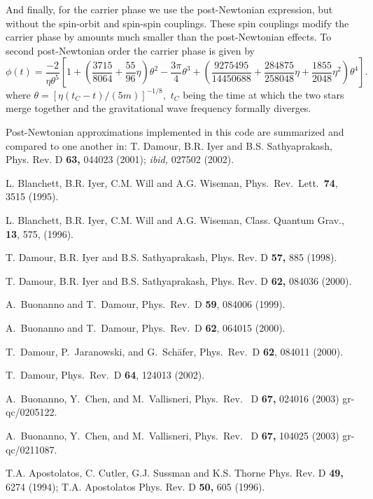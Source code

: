 And finally, for the carrier phase we use the post-Newtonian 
expression, but without the spin-orbit and
spin-spin couplings. These spin couplings modify the carrier phase 
by amounts much smaller than the post-Newtonian effects.
To second post-Newtonian order the carrier phase is given by
\begin{equation}
\phi(t) = 
\frac{-2}{\eta\theta^5}\left[1+\left(\frac{3715}{8064}+\frac
{55}{96}\eta\right)\theta^2-\frac{3\pi}{4}\theta^3 
+\left(\frac{9275495}{14450688}+\frac{284875}{258048}\eta+\frac{1855}{2048}\eta^2\right)\theta^4\right].
\label{eqn:phi}
\end{equation}
where $\theta=[\eta (t_C-t)/(5m)]^{-1/8},$ $t_C$ being the time at which the two stars
merge together and the gravitational wave frequency formally diverges.


\newpage
\begin{thebibliography}{}
 Post-Newtonian approximations implemented in this code are 
summarized and compared to one another in: 
T. Damour, B.R. Iyer and B.S. Sathyaprakash, 
Phys. Rev. D {\bf 63,} 044023 (2001); {\em ibid,} 027502 (2002).

L. Blanchett, B.R. Iyer, C.M. Will and A.G. Wiseman, 
Phys.\ Rev.\ Lett.\ {\bf 74}, 3515 (1995).

L. Blanchett, B.R. Iyer, C.M. Will and A.G. Wiseman, 
Class. Quantum Grav., {\bf 13}, 575, (1996).

 T. Damour, B.R. Iyer and B.S. Sathyaprakash, 
Phys. Rev. D {\bf 57,} 885 (1998). 

 T. Damour, B.R. Iyer and B.S. Sathyaprakash, 
Phys. Rev. D {\bf 62,} 084036 (2000). 

A.\ Buonanno and T.\ Damour,
Phys.\ Rev.\ D {\bf 59}, 084006 (1999).

A.\ Buonanno and T.\ Damour,
Phys.\ Rev.\ D {\bf 62}, 064015 (2000). 

T.\ Damour, P.\ Jaranowski, and G.\ Sch\"afer,
Phys.\ Rev.\ D {\bf 62}, 084011 (2000).

T.\ Damour,
Phys.\ Rev.\ D {\bf 64}, 124013 (2002).

A.\ Buonanno, Y.\ Chen, and M.\ Vallisneri,
Phys.\ Rev. \ D {\bf 67,} 024016 (2003)
gr-qc/0205122.

A.\ Buonanno, Y.\ Chen, and M.\ Vallisneri,
Phys.\ Rev. \ D {\bf 67,} 104025 (2003)
gr-qc/0211087.

T.A. Apostolatos, C. Cutler, G.J. Sussman
and K.S. Thorne Phys. Rev. D {\bf 49,} 6274 (1994);
T.A. Apostolatos Phys. Rev. D {\bf 50,} 605 (1996).

\end{thebibliography}
